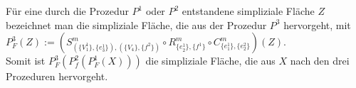 \documentclass[12pt,titlepage]{article}
\newcommand{\gelb}{0.550000011920929}
\begin{document}
Für eine durch die Prozedur $P^1$ oder $P^2$ entstandene simpliziale Fläche $Z$ bezeichnet man die simpliziale Fläche, die aus der Prozedur $P^3$ hervorgeht, mit \emph{$P^3_F(Z)$}$:=(S^m_{(\{V_1^1\},\{e_3^1\}),(\{V_4\},\{f^2\})} \circ R^m_{\{e_2^1\},\{f^1\}} \circ C^m_{\{e_1^1\},\{e_2^2\}})(Z)$. \\
Somit ist $P^3_F(P^2_f(P^1_F(X)))$ die simpliziale Fläche, die aus $X$ nach den drei Prozeduren hervorgeht.
\begin{comment}
\definecolor{uuuuuu}{rgb}{0.26666666666666666,0.26666666666666666,0.26666666666666666}
\definecolor{ududff}{rgb}{0.30196078431372547,0.30196078431372547,1.}
\definecolor{ffffqq}{rgb}{1.,1.,0.}
\begin{tikzpicture}[line cap=round,line join=round,>=triangle 45,x=1.5cm,y=1.5cm]
x=1.5cm,y=1.5cm,
axis lines=middle,
ymajorgrids=true,
xmajorgrids=true,
xmin=-4.3,
xmax=7.0600000000000005,
ymin=-2.46,
ymax=6.3,
xtick={-4.0,-3.0,...,7.0},
ytick={-2.0,-1.0,...,6.0},]
\clip(-4.3,-0.46) rectangle (3.06,4.3);
\fill[line width=2.pt,color=ffffqq,fill=ffffqq,fill opacity=\gelb] (-2.5,-0.1) -- (2.4,-0.1) -- (2.4,4.1) -- (-2.5,4.1) -- cycle;
\draw [line width=2.pt] (-1.,2.)-- (1.,2.);
\draw [line width=2.pt] (1.,2.)-- (0.,3.7320508075688776);
\draw [line width=2.pt] (0.,3.7320508075688776)-- (-1.,2.);
\draw [line width=2.pt] (1.,2.)-- (-1.,2.);
\draw [line width=2.pt] (-1.,2.)-- (0.,0.2679491924311226);
\draw [line width=2.pt] (0.,0.2679491924311226)-- (1.,2.);
\begin{scriptsize}
\draw [fill=ududff] (-1.,2.) circle (2.5pt);
\draw[color=black] (-1.6,2.2) node {$\{V_1^1,V_1^2,V_1^3\}$};
\draw [fill=ududff] (1.,2.) circle (2.5pt);
\draw[color=black] (1.54,2.07) node {$\{V_2^1,V_2^2\}$};
\draw[color=black] (0.,2.75) node {$F$};
\draw[color=black] (0.06,1.85) node {$\{e_3^1,e_3^2\}$};
\draw[color=black] (0.87,2.96) node {$\{e_1^1,e_1^2\}$};
\draw[color=black] (-0.87,2.96) node {$\{e_2^1,e_2^2\}$};
\draw [fill=ududff] (0.,3.7320508075688776) circle (2.5pt);
\draw[color=black] (0.,3.91) node {$\{V_3^1,V_3^2\}$};
\draw[color=black] (0.,1.31) node {$F'$};
\draw[color=black] (-1.,1.16) node {$\{f^1,f^2\}$};
\draw[color=black] (0.8,1.16) node {$\{g\}$};
\draw [fill=ududff] (0.,0.2679491924311226) circle (2.5pt);
\draw[color=black] (0.,0.1) node {$\{V_4\}$};
\end{scriptsize}
\end{tikzpicture}
\end{comment}
\end{document}
